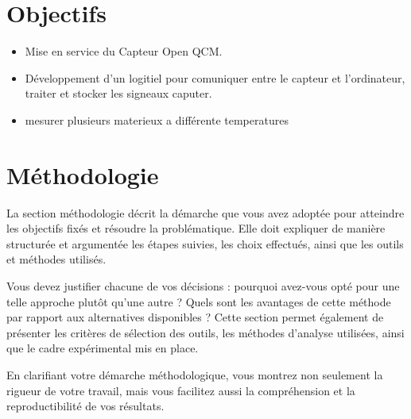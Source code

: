 \section{Objectifs}
\begin{itemize}
    \item Mise en service du Capteur Open QCM.
    \item Développement d'un logitiel pour comuniquer entre le capteur et l'ordinateur, traiter et stocker les signeaux caputer.
    \item mesurer plusieurs materieux a différente temperatures

\end{itemize}

\section{Méthodologie}

La section méthodologie décrit la démarche que vous avez adoptée pour atteindre les objectifs fixés et résoudre la problématique. Elle doit expliquer de manière structurée et argumentée les étapes suivies, les choix effectués, ainsi que les outils et méthodes utilisés.

Vous devez justifier chacune de vos décisions : pourquoi avez-vous opté pour une telle approche plutôt qu'une autre ? Quels sont les avantages de cette méthode par rapport aux alternatives disponibles ? Cette section permet également de présenter les critères de sélection des outils, les méthodes d'analyse utilisées, ainsi que le cadre expérimental mis en place.

En clarifiant votre démarche méthodologique, vous montrez non seulement la rigueur de votre travail, mais vous facilitez aussi la compréhension et la reproductibilité de vos résultats.
